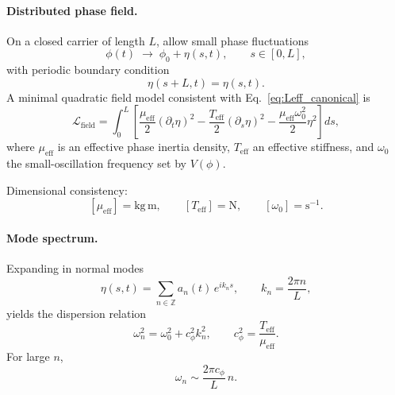 \documentclass[11pt]{article}
\theoremstyle{definition}
\theoremstyle{plain}
\theoremstyle{remark}
\begin{document}
    \paragraph{Distributed phase field.}
        On a closed carrier of length $L$, allow small phase fluctuations
        \begin{equation}
            \phi(t) \;\longrightarrow\; \phi_0 + \eta(s,t),
            \qquad s\in[0,L],
        \end{equation}
        with periodic boundary condition
        \begin{equation}
            \eta(s+L,t)=\eta(s,t).
        \end{equation}
        A minimal quadratic field model consistent with Eq.~\eqref{eq:Leff_canonical} is
        \begin{equation}
            \mathcal{L}_{\mathrm{field}}
            =
            \int_0^L
            \left[
                \frac{\mu_{\mathrm{eff}}}{2}(\partial_t \eta)^2
            -
                \frac{T_{\mathrm{eff}}}{2}(\partial_s \eta)^2
            -
                \frac{\mu_{\mathrm{eff}}\omega_0^2}{2}\eta^2
            \right] ds,
            \label{eq:field_model}
        \end{equation}
        where $\mu_{\mathrm{eff}}$ is an effective phase inertia density, $T_{\mathrm{eff}}$ an effective stiffness, and $\omega_0$ the small-oscillation frequency set by $V(\phi)$.
        
        Dimensional consistency:
        \[
            [\mu_{\mathrm{eff}}]=\mathrm{kg\,m},\qquad
            [T_{\mathrm{eff}}]=\mathrm{N},\qquad
            [\omega_0]=\mathrm{s^{-1}}.
        \]

    \paragraph{Mode spectrum.}
        Expanding in normal modes
        \begin{equation}
            \eta(s,t) = \sum_{n\in\mathbb{Z}} a_n(t)\, e^{i k_n s},
            \qquad
            k_n = \frac{2\pi n}{L},
        \end{equation}
        yields the dispersion relation
        \begin{equation}
            \boxed{
                \omega_n^2
                =
                \omega_0^2
                +
                c_\phi^2 k_n^2,
                \qquad
                c_\phi^2 = \frac{T_{\mathrm{eff}}}{\mu_{\mathrm{eff}}}.
            }
            \label{eq:dispersion}
        \end{equation}
        For large $n$,
        \begin{equation}
            \omega_n \sim \frac{2\pi c_\phi}{L}\, n.
            \label{eq:asymptotic_linear}
        \end{equation}
\end{document}
